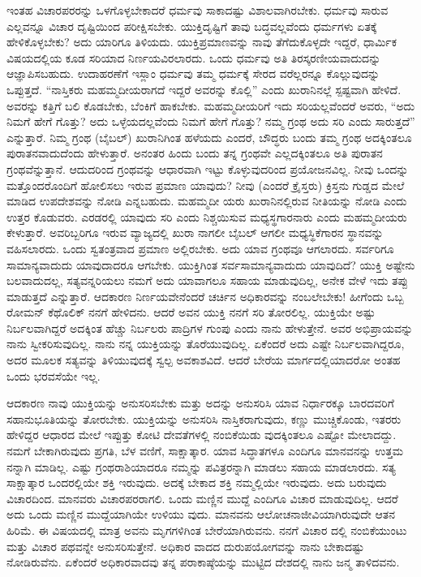 ಇಂತಹ ವಿಚಾರಪರರನ್ನು ಒಳಗೊಳ್ಳಬೇಕಾದರೆ ಧರ್ಮವು ಸಾಕಾದಷ್ಟು ವಿಶಾಲವಾಗಿರಬೇಕು. ಧರ್ಮವು ಸಾರುವ ಎಲ್ಲವನ್ನೂ ವಿಚಾರ ದೃಷ್ಟಿಯಿಂದ ಪರೀಕ್ಷಿಸಬೇಕು. ಯುಕ್ತಿದೃಷ್ಟಿಗೆ ತಾವು ಬದ್ಧವಲ್ಲವೆಂದು ಧರ್ಮಗಳು ಏತಕ್ಕೆ ಹೇಳಿಕೊಳ್ಳಬೇಕು? ಅದು ಯಾರಿಗೂ ತಿಳಿಯದು. ಯುಕ್ತಿಪ್ರಮಾಣವನ್ನು ನಾವು ತೆಗೆದುಕೊಳ್ಳದೇ ಇದ್ದರೆ, ಧಾರ್ಮಿಕ ವಿಷಯದಲ್ಲಿಯ ಕೂಡ ಸರಿಯಾದ ನಿರ್ಣಯವಿರಲಾರದು. ಒಂದು ಧರ್ಮವು ಅತಿ ತಿರಸ್ಕರಣೀಯವಾದುದನ್ನು ಆಜ್ಞಾಪಿಸಬಹುದು. ಉದಾಹರಣೆಗೆ ಇಸ್ಲಾಂ ಧರ್ಮವು ತಮ್ಮ ಧರ್ಮಕ್ಕೆ ಸೇರದ ವರೆಲ್ಲರನ್ನೂ ಕೊಲ್ಲುವುದನ್ನು ಒಪ್ಪುತ್ತದೆ. “ನಾಸ್ತಿಕರು ಮಹಮ್ಮದೀಯರಾಗದೆ ಇದ್ದರೆ ಅವರನ್ನು ಕೊಲ್ಲಿ” ಎಂದು ಖುರಾನಿನಲ್ಲೆ ಸ್ಪಷ್ಟವಾಗಿ ಹೇಳಿದೆ. ಅವರನ್ನು ಕತ್ತಿಗೆ ಬಲಿ ಕೊಡಬೇಕು, ಬೆಂಕಿಗೆ ಹಾಕಬೇಕು. ಮಹಮ್ಮದೀಯರಿಗೆ ಇದು ಸರಿಯಲ್ಲವೆಂದರೆ ಅವರು, “ಅದು ನಿಮಗೆ ಹೇಗೆ ಗೊತ್ತು? ಅದು ಒಳ್ಳೆಯದಲ್ಲವೆಂದು ನಿಮಗೆ ಹೇಗೆ ಗೊತ್ತು? ನಮ್ಮ ಗ್ರಂಥ ಅದು ಸರಿ ಎಂದು ಸಾರುತ್ತದೆ” ಎನ್ನುತ್ತಾರೆ. ನಿಮ್ಮ ಗ್ರಂಥ (ಬೈಬಲ್​) ಖುರಾನಿಗಿಂತ ಹಳೆಯದು ಎಂದರೆ, ಬೌದ್ಧರು ಬಂದು ತಮ್ಮ ಗ್ರಂಥ ಅದಕ್ಕಿಂತಲೂ ಪುರಾತನವಾದುದೆಂದು ಹೇಳುತ್ತಾರೆ. ಅನಂತರ ಹಿಂದು ಬಂದು ತನ್ನ ಗ್ರಂಥವೇ ಎಲ್ಲದಕ್ಕಿಂತಲೂ ಅತಿ ಪುರಾತನ ಗ್ರಂಥವೆನ್ನುತ್ತಾನೆ. ಆದುದರಿಂದ ಗ್ರಂಥವನ್ನು ಆಧಾರವಾಗಿ ಇಟ್ಟು ಕೊಳ್ಳುವುದರಿಂದ ಪ್ರಯೋಜನವಿಲ್ಲ. ನೀವು ಒಂದನ್ನು ಮತ್ತೊಂದರೊಂದಿಗೆ ಹೋಲಿಸಲು ಇರುವ ಪ್ರಮಾಣ ಯಾವುದು? ನೀವು (ಎಂದರೆ ಕ್ರೈಸ್ತರು) ಕ್ರಿಸ್ತನು ಗುಡ್ಡದ ಮೇಲೆ ಮಾಡಿದ ಉಪದೇಶವನ್ನು ನೋಡಿ ಎನ್ನಬಹುದು. ಮಹಮ್ಮದೀ ಯರು ಖುರಾನಿನಲ್ಲಿರುವ ನೀತಿಯನ್ನು ನೋಡಿ ಎಂದು ಉತ್ತರ ಕೊಡುವರು. ಎರಡರಲ್ಲಿ ಯಾವುದು ಸರಿ ಎಂದು ನಿಶ್ಚಯಿಸುವ ಮಧ್ಯಸ್ಥಗಾರನಾರು ಎಂದು ಮಹಮ್ಮದೀಯರು ಕೇಳುತ್ತಾರೆ. ಅವರಿಬ್ಬರಿಗೂ ಇರುವ ವ್ಯಾಜ್ಯದಲ್ಲಿ ಖುರಾ ನಾಗಲೀ ಬೈಬಲ್​ ಆಗಲೀ ಮಧ್ಯಸ್ಥಿಕೆಗಾರನ ಸ್ಥಾನವನ್ನು ವಹಿಸಲಾರದು. ಒಂದು ಸ್ವತಂತ್ರವಾದ ಪ್ರಮಾಣ ಅಲ್ಲಿರಬೇಕು. ಅದು ಯಾವ ಗ್ರಂಥವೂ ಆಗಲಾರದು. ಸರ್ವರಿಗೂ ಸಾಮಾನ್ಯವಾದುದು ಯಾವುದಾದರೂ ಆಗಬೇಕು. ಯುಕ್ತಿಗಿಂತ ಸರ್ವಸಾಮಾನ್ಯವಾದುದು ಯಾವುದಿದೆ? ಯುಕ್ತಿ ಅಷ್ಟೇನು ಬಲವಾದುದಲ್ಲ, ಸತ್ಯವನ್ನರಿಯಲು ನಮಗೆ ಅದು ಯಾವಾಗಲೂ ಸಹಾಯ ಮಾಡುವುದಿಲ್ಲ, ಅನೇಕ ವೇಳೆ ಇದು ತಪ್ಪು ಮಾಡುತ್ತದೆ ಎನ್ನುತ್ತಾರೆ. ಆದಕಾರಣ ನಿರ್ಣಯವೇನೆಂದರೆ ಚರ್ಚಿನ ಅಧಿಕಾರವನ್ನು ನಂಬಲೇಬೇಕು! ಹೀಗೆಂದು ಒಬ್ಬ ರೋಮನ್​ ಕೆಥೊಲಿಕ್​ ನನಗೆ ಹೇಳಿದನು. ಆದರೆ ಅವನ ಯುಕ್ತಿ ನನಗೆ ಸರಿ ತೋರಲಿಲ್ಲ. ಯುಕ್ತಿಯೇ ಅಷ್ಟು ನಿರ್ಬಲವಾಗಿದ್ದರೆ ಅದಕ್ಕಿಂತ ಹೆಚ್ಚು ನಿರ್ಬಲರು ಪಾದ್ರಿಗಳ ಗುಂಪು ಎಂದು ನಾನು ಹೇಳುತ್ತೇನೆ. ಅವರ ಅಭಿಪ್ರಾಯವನ್ನು ನಾನು ಸ್ವೀಕರಿಸುವುದಿಲ್ಲ. ನಾನು ನನ್ನ ಯುಕ್ತಿಯನ್ನು ತೊರೆಯುವುದಿಲ್ಲ. ಏಕೆಂದರೆ ಅದು ಎಷ್ಟೇ ನಿರ್ಬಲವಾಗಿದ್ದರೂ, ಅದರ ಮೂಲಕ ಸತ್ಯವನ್ನು ತಿಳಿಯುವುದಕ್ಕೆ ಸ್ವಲ್ಪ ಅವಕಾಶವಿದೆ. ಆದರೆ ಬೇರೆಯ ಮಾರ್ಗದಲ್ಲಿಯಾದರೋ ಅಂತಹ ಒಂದು ಭರವಸೆಯೇ ಇಲ್ಲ.

ಆದಕಾರಣ ನಾವು ಯುಕ್ತಿಯನ್ನು ಅನುಸರಿಸಬೇಕು ಮತ್ತು ಅದನ್ನು ಅನುಸರಿಸಿ ಯಾವ ನಿರ್ಧಾರಕ್ಕೂ ಬಾರದವರಿಗೆ ಸಹಾನುಭೂತಿಯನ್ನು ತೋರಬೇಕು. ಯುಕ್ತಿಯನ್ನು ಅನುಸರಿಸಿ ನಾಸ್ತಿಕರಾಗುವುದು, ಕಣ್ಣು ಮುಚ್ಚಿಕೊಂಡು, ಇತರರು ಹೇಳಿದ್ದರ ಆಧಾರದ ಮೇಲೆ ಇಪ್ಪುತ್ತು ಕೋಟಿ ದೇವತೆಗಳಲ್ಲಿ ನಂಬಿಕೆಯಿಡು ವುದಕ್ಕಿಂತಲೂ ಎಷ್ಟೋ ಮೇಲಾದದ್ದು. ನಮಗೆ ಬೇಕಾಗಿರುವುದು ಪ್ರಗತಿ, ಬೆಳ ವಣಿಗೆ, ಸಾಕ್ಷಾತ್ಕಾರ. ಯಾವ ಸಿದ್ಧಾತಗಳೂ ಎಂದಿಗೂ ಮಾನವನನ್ನು ಉತ್ತಮ ನನ್ನಾಗಿ ಮಾಡಿಲ್ಲ. ಎಷ್ಟು ಗ್ರಂಥರಾಶಿಯಾದರೂ ನಮ್ಮನ್ನು ಪವಿತ್ರರನ್ನಾಗಿ ಮಾಡಲು ಸಹಾಯ ಮಾಡಲಾರದು. ಸತ್ಯ ಸಾಕ್ಷಾತ್ಕಾರ ಒಂದರಲ್ಲಿಯೇ ಶಕ್ತಿ ಇರುವುದು. ಅದಕ್ಕೆ ಬೇಕಾದ ಶಕ್ತಿ ನಮ್ಮಲ್ಲಿಯೇ ಇರುವುದು. ಅದು ಬರುವುದು ವಿಚಾರದಿಂದ. ಮಾನವರು ವಿಚಾರಪರರಾಗಲಿ. ಒಂದು ಮಣ್ಣಿನ ಮುದ್ದೆ ಎಂದಿಗೂ ವಿಚಾರ ಮಾಡುವುದಿಲ್ಲ. ಆದರೆ ಅದು ಒಂದು ಮಣ್ಣಿನ ಮುದ್ದೆಯಾಗಿಯೇ ಉಳಿಯು ವುದು. ಮಾನವನು ಆಲೋಚನಾಜೀವಿಯಾಗಿರುವುದೇ ಆತನ ಹಿರಿಮೆ. ಈ ವಿಷಯದಲ್ಲಿ ಮಾತ್ರ ಅವನು ಮೃಗಗಳಿಗಿಂತ ಬೇರೆಯಾಗಿರುವನು. ನನಗೆ ವಿಚಾರ ದಲ್ಲಿ ನಂಬಿಕೆಯುಂಟು ಮತ್ತು ವಿಚಾರ ಪಥವನ್ನೇ ಅನುಸರಿಸುತ್ತೇನೆ. ಅಧಿಕಾರ ವಾದದ  ದುರುಪಯೋಗವನ್ನು ನಾನು ಬೇಕಾದಷ್ಟು ನೋಡಿರುವೆನು. ಏಕೆಂದರೆ ಅಧಿಕಾರವಾದವು ತನ್ನ ಪರಾಕಾಷ್ಠೆಯನ್ನು ಮುಟ್ಟಿದ ದೇಶದಲ್ಲಿ ನಾನು ಜನ್ಮ ತಾಳಿದವನು.

